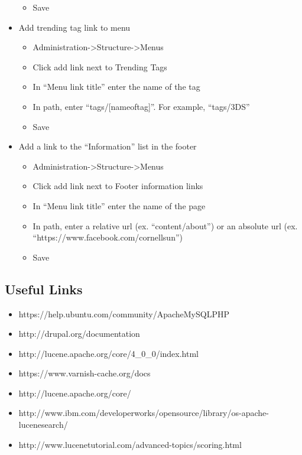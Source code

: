 \documentclass[11pt]{article} %
\begin{document}
\begin{itemize}
\begin{itemize}
	\item Save
	\end{itemize}
\item Add trending tag link to menu
	\begin{itemize}
	\itemindent 10pt
	\item Administration->Structure->Menus
	\item Click add link next to Trending Tags
	\item In “Menu link title” enter the name of the tag
	\item In path, enter “tags/[nameoftag]”. For example, “tags/3DS”
	\item Save
	\end{itemize}
\item Add a link to the “Information” list in the footer
	\begin{itemize}
	\itemindent 10pt
	\item Administration->Structure->Menus
	\item Click add link next to Footer information links
	\item In “Menu link title” enter the name of the page
	\item In path, enter a relative url (ex. “content/about”) or an absolute url (ex. “https://www.facebook.com/cornellsun”)
	\item Save
	\end{itemize}
\end{itemize}

\subsection{Useful Links}

\begin{itemize}
\item https://help.ubuntu.com/community/ApacheMySQLPHP
\item http://drupal.org/documentation
\item http://lucene.apache.org/core/4\_0\_0/index.html
\item https://www.varnish-cache.org/docs
\item http://lucene.apache.org/core/
\item http://www.ibm.com/developerworks/opensource/library/os-apache-lucenesearch/
\item http://www.lucenetutorial.com/advanced-topics/scoring.html
\end{itemize}
\end{document}
